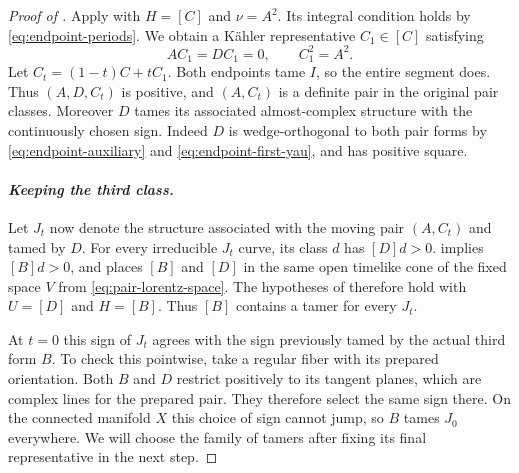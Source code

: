 \begin{proof}[Proof of ]
Apply  with
$H=[C]$ and $\nu=A^2$. Its integral condition holds by
\eqref{eq:endpoint-periods}. We obtain a K\"ahler representative
$C_1\in[C]$ satisfying
\begin{equation}\label{eq:endpoint-first-yau}
 AC_1=DC_1=0,\qquad C_1^2=A^2.
\end{equation}
Let $C_t=(1-t)C+tC_1$. Both endpoints tame $I$, so the entire segment
does. Thus $(A,D,C_t)$ is
positive, and $(A,C_t)$ is a definite pair in the original pair
classes. Moreover $D$ tames its associated almost-complex structure
with the continuously chosen sign. Indeed $D$ is wedge-orthogonal
to both pair forms by \eqref{eq:endpoint-auxiliary} and
\eqref{eq:endpoint-first-yau}, and has positive square.

\paragraph{\emph{Keeping the third class.}}
Let $J_t$ now denote the structure associated with the moving pair
$(A,C_t)$ and tamed by $D$. For every irreducible $J_t$ curve, its
class $d$ has $[D]d>0$.  implies
$[B]d>0$, and places $[B]$ and $[D]$ in the same open timelike cone
of the fixed space $V$ from \eqref{eq:pair-lorentz-space}.
The hypotheses of  therefore hold with
$U=[D]$ and $H=[B]$. Thus $[B]$ contains a tamer for every $J_t$.

At $t=0$ this sign of $J_t$ agrees with the sign previously tamed by
the actual third form $B$.  To check this pointwise, take a regular
fiber with its prepared orientation.  Both $B$ and $D$ restrict
positively to its tangent planes, which are complex lines for the
prepared pair.  They therefore select the same sign there.  On the
connected manifold $X$ this choice of sign cannot jump, so $B$ tames
$J_0$ everywhere.  We will choose the family of tamers after fixing its
final representative in the next step.


\end{proof}
